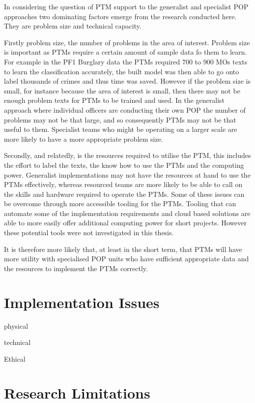 In considering the question of PTM support to the generalist and specialist POP approaches two dominating factors emerge from the research conducted here. They are problem size and technical capacity. 

Firstly problem size, the number of problems in the area of interest. Problem size is important as PTMs require a certain amount of sample data fo them to learn. For example in the PF1 Burglary data the PTMs required 700 to 900 MOs texts to learn the classification accurately, the built model was then able to go onto label thousands of crimes and thus time was saved. However if the problem size is small, for instance because the area of interest is small, then there may not be enough problem texts for PTMs to be trained and used.  In the generalist approach where individual officers are conducting their own POP the number of  problems may not be that large, and so consequently PTMs may not be that useful to them. Specialist teams who might be operating on a larger scale are more likely to have a more appropriate problem size.  

Secondly, and relatedly, is the resources required to utilise the PTM, this includes the effort to label the texts, the know how to use the PTMs and the computing power. Generalist implementations may not have the resources at hand to use the PTMs effectively, whereas resourced teams are more likely to be able to call on the skills and hardware required to operate the PTMs. Some of these issues can be overcome through more accessible tooling for the PTMs. Tooling that can automate some of the implementation requirements and cloud based solutions are able to more easily offer additional computing power for short projects. However these potential tools were not investigated in this thesis.

It is therefore more likely that, at least in the short term, that PTMs will have more utility with specialised POP units who have sufficient appropriate data and the resources to implement the PTMs correctly.

\section{Implementation Issues}

physical

technical

Ethical


\section{Research Limitations}
